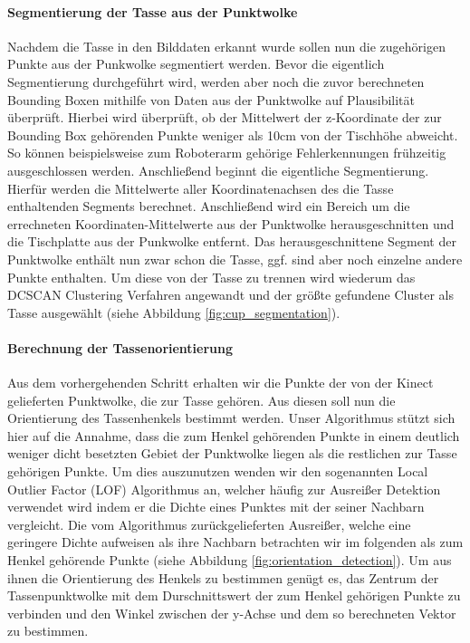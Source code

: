 \paragraph{Segmentierung der Tasse aus der Punktwolke}
Nachdem die Tasse in den Bilddaten erkannt wurde sollen nun die zugehörigen Punkte aus der Punkwolke segmentiert werden. Bevor die eigentlich Segmentierung durchgeführt wird, werden aber noch die zuvor berechneten Bounding Boxen mithilfe von Daten aus der Punktwolke auf Plausibilität überprüft. Hierbei wird überprüft, ob der Mittelwert der z-Koordinate der zur Bounding Box gehörenden Punkte weniger als 10cm von der Tischhöhe abweicht. So können beispielsweise zum Roboterarm gehörige Fehlerkennungen frühzeitig ausgeschlossen werden. Anschließend beginnt die eigentliche Segmentierung. Hierfür werden die Mittelwerte aller Koordinatenachsen des die Tasse enthaltenden Segments berechnet. Anschließend wird ein Bereich um die errechneten Koordinaten-Mittelwerte aus der Punktwolke herausgeschnitten und die Tischplatte aus der Punkwolke entfernt. Das herausgeschnittene Segment der Punktwolke enthält nun zwar schon die Tasse, ggf. sind aber noch einzelne andere Punkte enthalten. Um diese von der Tasse zu trennen wird wiederum das DCSCAN Clustering Verfahren angewandt und der größte gefundene Cluster als Tasse ausgewählt (siehe Abbildung \ref{fig:cup_segmentation}).

\paragraph{Berechnung der Tassenorientierung}
Aus dem vorhergehenden Schritt erhalten wir die Punkte der von der Kinect gelieferten Punktwolke, die zur Tasse gehören. Aus diesen soll nun die Orientierung des Tassenhenkels bestimmt werden. Unser Algorithmus stützt sich hier auf die Annahme, dass die zum Henkel gehörenden Punkte in einem deutlich weniger dicht besetzten Gebiet der Punktwolke liegen als die restlichen zur Tasse gehörigen Punkte. Um dies auszunutzen wenden wir den sogenannten Local Outlier Factor (LOF) Algorithmus an, welcher häufig zur Ausreißer Detektion verwendet wird indem er  die Dichte eines Punktes mit der seiner Nachbarn vergleicht. Die vom Algorithmus zurückgelieferten Ausreißer, welche eine geringere Dichte aufweisen als ihre Nachbarn betrachten wir im folgenden als zum Henkel gehörende Punkte (siehe Abbildung \ref{fig:orientation_detection}). Um aus ihnen die Orientierung des Henkels zu bestimmen genügt es, das Zentrum der Tassenpunktwolke mit dem Durschnittswert der zum Henkel gehörigen Punkte zu verbinden und den Winkel zwischen der y-Achse und dem so berechneten Vektor zu bestimmen.

